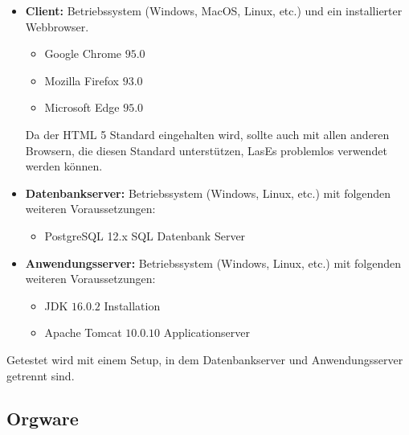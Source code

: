 \begin{itemize}

	\item \textbf{Client:} Betriebssystem (Windows, MacOS, Linux, etc.) und ein installierter Webbrowser.

	\begin{itemize}
		\item Google Chrome $95.0$
		\item Mozilla Firefox $93.0$
		\item Microsoft Edge $95.0$
	\end{itemize}

	Da der HTML 5 Standard eingehalten wird, sollte auch mit allen anderen Browsern, die diesen Standard unterstützen, LasEs problemlos verwendet werden können.

	\item \textbf{Datenbankserver:} Betriebssystem (Windows, Linux, etc.) mit folgenden weiteren Voraussetzungen:

	\begin{itemize}
		\item PostgreSQL 12.x SQL Datenbank Server
	\end{itemize}

	\item \textbf{Anwendungsserver:} Betriebssystem (Windows, Linux, etc.) mit folgenden weiteren Voraussetzungen:

	\begin{itemize}
		\item JDK $16.0.2$ Installation
		\item Apache Tomcat $10.0.10$ Applicationserver
	\end{itemize}

\end{itemize}

	Getestet wird mit einem Setup, in dem Datenbankserver und Anwendungsserver getrennt sind.

\subsection{Orgware}


